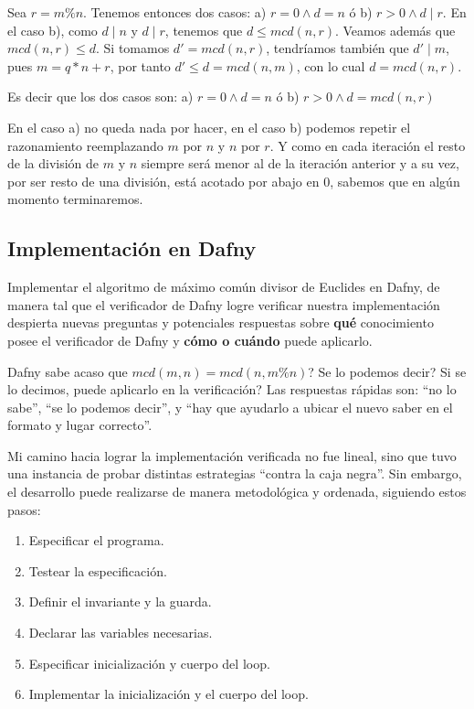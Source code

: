 \documentclass[12pt, a4paper, openany, fleqn]{book}
\begin{document}
    Sea $r = m \% n$. Tenemos entonces dos casos: a) $r = 0 \land d = n$ ó b) $r > 0 \land d \mid r $. En el caso b), como $d \mid n$ y $d \mid r$, tenemos que $d \leq mcd(n, r)$. Veamos además que $mcd(n,r) \leq d$. Si tomamos $d'=mcd(n,r)$, tendríamos también que $d' \mid m$, pues $m = q * n + r$, por tanto $d' \leqslant d = mcd(n,m)$, con lo cual $d = mcd(n,r)$.

    Es decir que los dos casos son: a) $r = 0 \land d = n$ ó b) $r > 0 \land d = mcd(n, r) $

    En el caso a) no queda nada por hacer, en el caso b) podemos repetir el razonamiento reemplazando $m$ por $n$ y $n$ por $r$. Y como en cada iteración el resto de la división de $m$ y $n$ siempre será menor al de la iteración anterior y a su vez, por ser resto de una división, está acotado por abajo en $0$, sabemos que en algún momento terminaremos.

    \subsection{Implementación en Dafny}
    Implementar el algoritmo de máximo común divisor de Euclides en Dafny, de manera tal que el verificador de Dafny logre verificar nuestra implementación despierta nuevas preguntas y potenciales respuestas sobre \textbf{qué} conocimiento posee el verificador de Dafny y \textbf{cómo o cuándo} puede aplicarlo.

    Dafny sabe acaso que $mcd(m, n) = mcd(n, m\%n)$? Se lo podemos decir? Si se lo decimos, puede aplicarlo en la verificación?
    Las respuestas rápidas son: ``no lo sabe'', ``se lo podemos decir'', y ``hay que ayudarlo a ubicar el nuevo saber en el formato y lugar correcto''.

    Mi camino hacia lograr la implementación verificada no fue lineal, sino que tuvo una instancia de probar distintas estrategias ``contra la caja negra''. Sin embargo, el desarrollo puede realizarse de manera metodológica y ordenada, siguiendo estos pasos:
    \begin{enumerate}
        \item Especificar el programa.
        \item Testear la especificación.
        \item Definir el invariante y la guarda.
        \item Declarar las variables necesarias.
        \item Especificar inicialización y cuerpo del loop.
        \item Implementar la inicialización y el cuerpo del loop.
    \end{enumerate}
\end{document}
